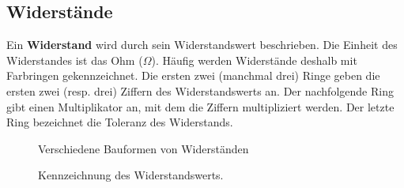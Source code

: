 \subsection{Widerstände}
Ein \textbf{Widerstand} wird durch sein Widerstandswert beschrieben. Die Einheit des Widerstandes ist das Ohm ($\Omega$). Häufig werden Widerstände deshalb mit Farbringen gekennzeichnet. Die ersten zwei (manchmal drei) Ringe geben die ersten zwei (resp. drei) Ziffern des Widerstandswerts an. Der nachfolgende Ring gibt einen Multiplikator an, mit dem die Ziffern multipliziert werden. Der letzte Ring bezeichnet die Toleranz des Widerstands. 
\begin{figure}[H]
\centering
{}
\caption{Verschiedene Bauformen von Widerständen}
\end{figure} 
\begin{figure}[H]
\centering
{}
\caption{Kennzeichnung des Widerstandswerts.}
\end{figure} 
